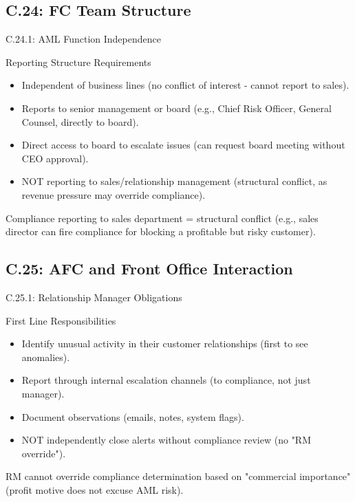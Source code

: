 \documentclass{beamer}
\begin{document}
	\subsection{C.24: FC Team Structure}
	
	\begin{frame}{C.24.1: AML Function Independence}
		\begin{block}{Reporting Structure Requirements}
			\begin{itemize}
				\item Independent of business lines (no conflict of interest - cannot report to sales).
				\item Reports to senior management or board (e.g., Chief Risk Officer, General Counsel, directly to board).
				\item Direct access to board to escalate issues (can request board meeting without CEO approval).
				\item NOT reporting to sales/relationship management (structural conflict, as revenue pressure may override compliance).
			\end{itemize}
		\end{block}
		\textbf{} Compliance reporting to sales department = structural conflict (e.g., sales director can fire compliance for blocking a profitable but risky customer).
	\end{frame}
	
	\subsection{C.25: AFC and Front Office Interaction}
	
	\begin{frame}{C.25.1: Relationship Manager Obligations}
		\begin{block}{First Line Responsibilities}
			\begin{itemize}
				\item Identify unusual activity in their customer relationships (first to see anomalies).
				\item Report through internal escalation channels (to compliance, not just manager).
				\item Document observations (emails, notes, system flags).
				\item NOT independently close alerts without compliance review (no "RM override").
			\end{itemize}
		\end{block}
		\textbf{} RM cannot override compliance determination based on "commercial importance" (profit motive does not excuse AML risk).
	\end{frame}
	
\end{document}
